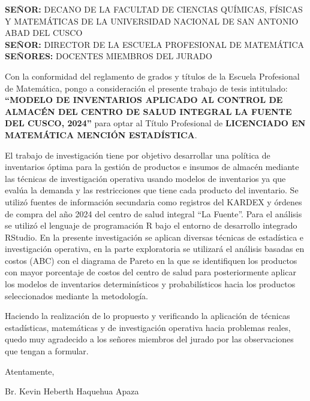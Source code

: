 \begin{presentacion}
\noindent
  \textbf{SEÑOR:} DECANO DE LA FACULTAD DE CIENCIAS QUÍMICAS, FÍSICAS Y MATEMÁTICAS DE LA UNIVERSIDAD NACIONAL DE SAN ANTONIO ABAD DEL CUSCO\\
  \textbf{SEÑOR:} DIRECTOR DE LA ESCUELA PROFESIONAL DE MATEMÁTICA\\
  \textbf{SEÑORES:} DOCENTES MIEMBROS DEL JURADO

\noindent
Con la conformidad del reglamento de grados y títulos de la Escuela Profesional de Matemática, pongo a consideración el presente trabajo de tesis intitulado: \textbf{ ``MODELO DE INVENTARIOS APLICADO AL CONTROL DE ALMACÉN DEL CENTRO DE SALUD INTEGRAL LA FUENTE DEL CUSCO, 2024''} para optar al Título Profesional de \textbf{LICENCIADO EN MATEMÁTICA MENCIÓN ESTADÍSTICA}.

\noindent
El trabajo de investigación tiene por objetivo desarrollar una política de inventarios óptima para la gestión de productos e insumos de almacén mediante las técnicas de investigación operativa usando modelos de inventarios ya que evalúa la demanda y las restricciones que tiene cada producto del inventario. 
Se utilizó fuentes de información secundaria como registros del KARDEX y órdenes de compra del año 2024 del centro de salud integral ``La Fuente''. 
Para el análisis se utilizó el lenguaje de programación R bajo el entorno de desarrollo integrado RStudio.
En la presente investigación se aplican diversas técnicas de estadística e investigación operativa, en la parte exploratoria se utilizará el análisis basadas en costos (ABC) con el diagrama de Pareto en la que se identifiquen los productos con mayor porcentaje de costos del centro de salud para posteriormente aplicar los modelos de inventarios determinísticos y probabilísticos hacia los productos seleccionados mediante la metodología.

\noindent
Haciendo la realización de lo propuesto y verificando la aplicación de técnicas estadísticas, matemáticas y de investigación operativa hacia problemas reales, quedo muy agradecido a los señores miembros del jurado por las observaciones que tengan a formular.


\begin{flushright}
  Atentamente,
  
  Br. Kevin Heberth Haquehua Apaza
\end{flushright}


\end{presentacion}
